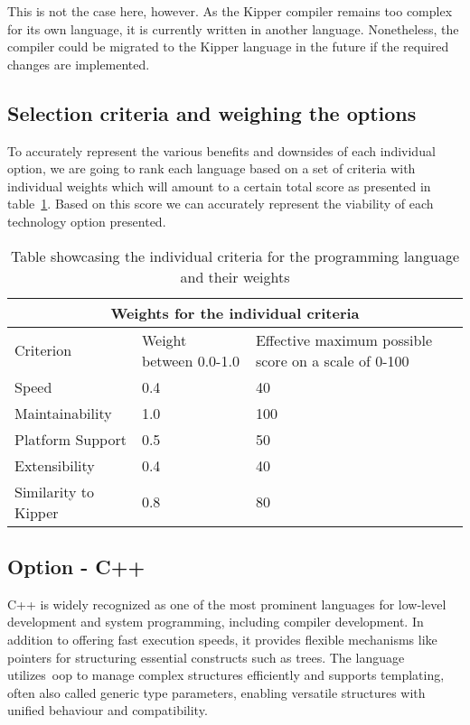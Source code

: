 This is not the case here, however. As the Kipper compiler remains too complex for its own language, it is currently written in another language. Nonetheless, the compiler could be migrated to the Kipper language in the future if the required changes are implemented.

\subsection{Selection criteria and weighing the options}
\label{sec:development-language-selection-criteria}

To accurately represent the various benefits and downsides of each individual option, we are going to rank each language based on a set of criteria with individual weights which will amount to a certain total score as presented in table~\ref{tab:programming-language-criteria-weights}. Based on this score we can accurately represent the viability of each technology option presented.

\begin{table}[H]
	\centering
	\begin{tabular}{ |p{4cm}|p{5cm}|p{5cm}|  }
		\hline
		\multicolumn{3}{|c|}{Weights for the individual criteria} \\
		\hline
		Criterion&Weight between 0.0-1.0&Effective maximum possible score on a scale of 0-100\\
		\hline
		Speed&0.4&40\\
		Maintainability&1.0&100\\
		Platform Support&0.5&50\\
		Extensibility&0.4&40\\
		Similarity to Kipper&0.8&80\\
		\hline
	\end{tabular}
	\caption{Table showcasing the individual criteria for the programming language and their weights}
	\label{tab:programming-language-criteria-weights}
\end{table}

\subsection{Option - C++}
\label{sec:programming-language-option-c++}

C++ is widely recognized as one of the most prominent languages for low-level development and system programming, including compiler development. In addition to offering fast execution speeds, it provides flexible mechanisms like pointers for structuring essential constructs such as trees. The language utilizes~\acrshort{oop} to manage complex structures efficiently and supports templating, often also called generic type parameters, enabling versatile structures with unified behaviour and compatibility.

